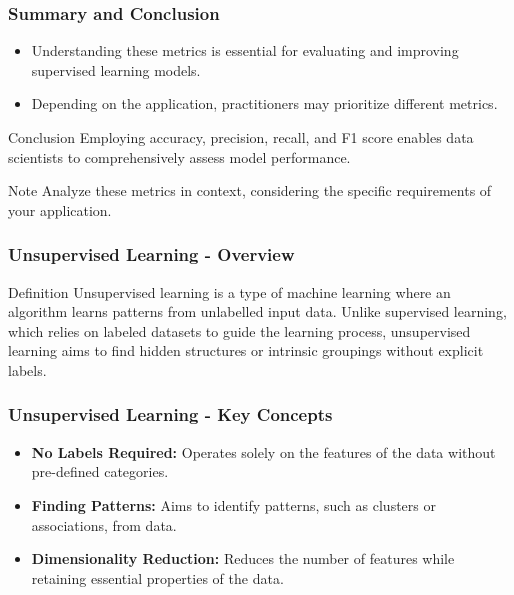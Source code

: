 \documentclass[aspectratio=169]{beamer}
\begin{document}
\begin{frame}[fragile]
    \frametitle{Summary and Conclusion}
    
    \begin{itemize}
        \item Understanding these metrics is essential for evaluating and improving supervised learning models.
        \item Depending on the application, practitioners may prioritize different metrics.
    \end{itemize}
    
    \begin{block}{Conclusion}
        Employing accuracy, precision, recall, and F1 score enables data scientists to comprehensively assess model performance.
    \end{block}

    \begin{block}{Note}
        Analyze these metrics in context, considering the specific requirements of your application.
    \end{block}
\end{frame}

\begin{frame}[fragile]
    \frametitle{Unsupervised Learning - Overview}
    \begin{block}{Definition}
        Unsupervised learning is a type of machine learning where an algorithm learns patterns from unlabelled input data. Unlike supervised learning, which relies on labeled datasets to guide the learning process, unsupervised learning aims to find hidden structures or intrinsic groupings without explicit labels.
    \end{block}
\end{frame}

\begin{frame}[fragile]
    \frametitle{Unsupervised Learning - Key Concepts}
    \begin{itemize}
        \item \textbf{No Labels Required:} Operates solely on the features of the data without pre-defined categories.
        \item \textbf{Finding Patterns:} Aims to identify patterns, such as clusters or associations, from data.
        \item \textbf{Dimensionality Reduction:} Reduces the number of features while retaining essential properties of the data.
    \end{itemize}
\end{frame}
\end{document}
